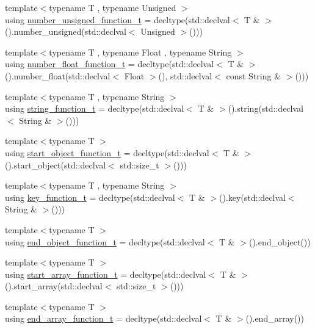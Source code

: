 \begin{DoxyCompactItemize}
\item 
{\footnotesize template$<$typename T , typename Unsigned $>$ }\\using \hyperlink{namespacenlohmann_1_1detail_a74da7b17bda76f65d276feb18209c913}{number\+\_\+unsigned\+\_\+function\+\_\+t} = decltype(std\+::declval$<$ T \& $>$().number\+\_\+unsigned(std\+::declval$<$ Unsigned $>$()))
\item 
{\footnotesize template$<$typename T , typename Float , typename String $>$ }\\using \hyperlink{namespacenlohmann_1_1detail_ad42df56e913abe26ed556e0e92f386f4}{number\+\_\+float\+\_\+function\+\_\+t} = decltype(std\+::declval$<$ T \& $>$().number\+\_\+float(std\+::declval$<$ Float $>$(), std\+::declval$<$ const String \& $>$()))
\item 
{\footnotesize template$<$typename T , typename String $>$ }\\using \hyperlink{namespacenlohmann_1_1detail_a27c3fc3bd42ac406f763184aa8ae4cb0}{string\+\_\+function\+\_\+t} = decltype(std\+::declval$<$ T \& $>$().string(std\+::declval$<$ String \& $>$()))
\item 
{\footnotesize template$<$typename T $>$ }\\using \hyperlink{namespacenlohmann_1_1detail_a5fff1e6dcaabd367d9b1109a5682f9d4}{start\+\_\+object\+\_\+function\+\_\+t} = decltype(std\+::declval$<$ T \& $>$().start\+\_\+object(std\+::declval$<$ std\+::size\+\_\+t $>$()))
\item 
{\footnotesize template$<$typename T , typename String $>$ }\\using \hyperlink{namespacenlohmann_1_1detail_a44869ca9f422b260625d78e4e8121559}{key\+\_\+function\+\_\+t} = decltype(std\+::declval$<$ T \& $>$().key(std\+::declval$<$ String \& $>$()))
\item 
{\footnotesize template$<$typename T $>$ }\\using \hyperlink{namespacenlohmann_1_1detail_af52d6d2521c386998ae940d118182ebc}{end\+\_\+object\+\_\+function\+\_\+t} = decltype(std\+::declval$<$ T \& $>$().end\+\_\+object())
\item 
{\footnotesize template$<$typename T $>$ }\\using \hyperlink{namespacenlohmann_1_1detail_a80273cecc45765d7b2826ec931fbffdd}{start\+\_\+array\+\_\+function\+\_\+t} = decltype(std\+::declval$<$ T \& $>$().start\+\_\+array(std\+::declval$<$ std\+::size\+\_\+t $>$()))
\item 
{\footnotesize template$<$typename T $>$ }\\using \hyperlink{namespacenlohmann_1_1detail_aec53c029383b34a72182210e58fadb79}{end\+\_\+array\+\_\+function\+\_\+t} = decltype(std\+::declval$<$ T \& $>$().end\+\_\+array())

\end{DoxyCompactItemize}
